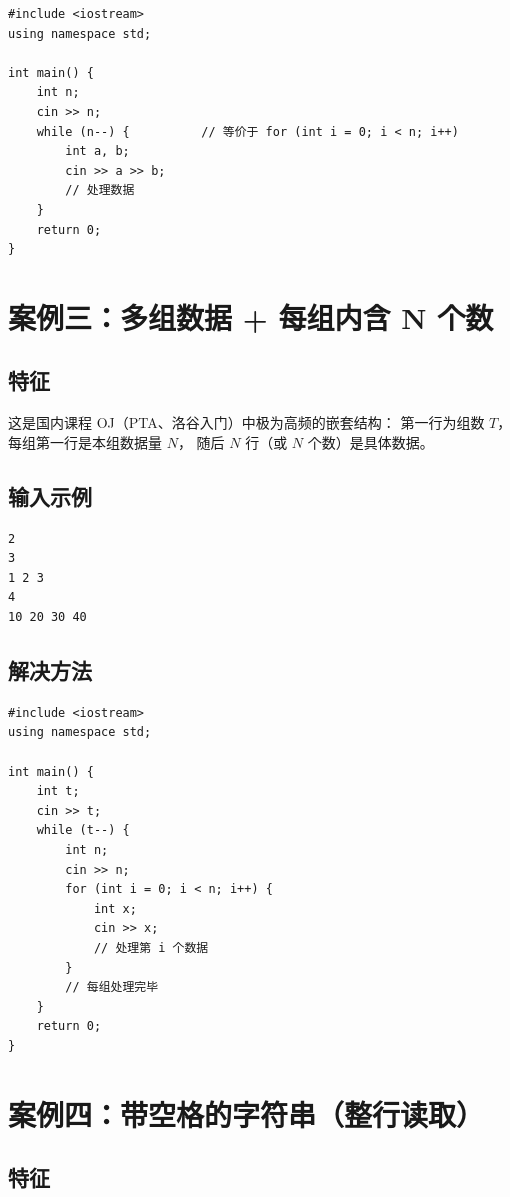 \documentclass[12pt, a4paper]{article}
\begin{document}
\begin{lstlisting}[style=cpp]
#include <iostream>
using namespace std;

int main() {
    int n;
    cin >> n;
    while (n--) {          // 等价于 for (int i = 0; i < n; i++)
        int a, b;
        cin >> a >> b;
        // 处理数据
    }
    return 0;
}
\end{lstlisting}

\section{案例三：多组数据 + 每组内含 N 个数}

\subsection{特征}

这是国内课程 OJ（PTA、洛谷入门）中极为高频的嵌套结构：
第一行为组数 $T$，每组第一行是本组数据量 $N$，
随后 $N$ 行（或 $N$ 个数）是具体数据。

\subsection{输入示例}

\begin{lstlisting}[style=input]
2
3
1 2 3
4
10 20 30 40
\end{lstlisting}

\subsection{解决方法}

\begin{lstlisting}[style=cpp]
#include <iostream>
using namespace std;

int main() {
    int t;
    cin >> t;
    while (t--) {
        int n;
        cin >> n;
        for (int i = 0; i < n; i++) {
            int x;
            cin >> x;
            // 处理第 i 个数据
        }
        // 每组处理完毕
    }
    return 0;
}
\end{lstlisting}

\section{案例四：带空格的字符串（整行读取）}

\subsection{特征}
\end{document}
